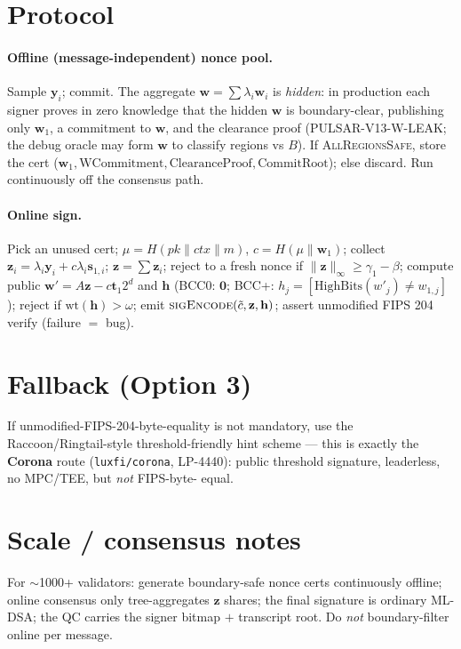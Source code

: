 \documentclass[11pt]{article}
\theoremstyle{remark}\newtheorem{remark}{Remark}
\begin{document}
\section{Protocol}
\paragraph{Offline (message-independent) nonce pool.} Sample $\mathbf
y_i$; commit. The aggregate $\mathbf w = \sum\lambda_i\mathbf w_i$ is
\emph{hidden}: in production each signer proves in zero knowledge that the
hidden $\mathbf w$ is boundary-clear, publishing only $\mathbf w_1$, a
commitment to $\mathbf w$, and the clearance proof (PULSAR-V13-W-LEAK; the
debug oracle may form $\mathbf w$ to classify regions vs $B$). If
\textsc{AllRegionsSafe}, store the cert ($\mathbf w_1,\text{WCommitment},
\text{ClearanceProof},\text{CommitRoot}$); else discard. Run continuously off
the consensus path.
\paragraph{Online sign.} Pick an unused cert; $\mu = H(pk\|ctx\|m)$, $c =
H(\mu\|\mathbf w_1)$; collect $\mathbf z_i = \lambda_i\mathbf y_i +
c\lambda_i\mathbf s_{1,i}$; $\mathbf z = \sum\mathbf z_i$; reject to a
fresh nonce if $\|\mathbf z\|_\infty \ge \gamma_1-\beta$; compute public
$\mathbf w' = A\mathbf z - c\mathbf t_1 2^d$ and $\mathbf h$ (BCC0:
$\mathbf 0$; BCC+: $h_j=[\mathrm{HighBits}(w'_j)\neq w_{1,j}]$); reject if
$\mathrm{wt}(\mathbf h) > \omega$; emit $\textsc{sigEncode}(\tilde
c,\mathbf z,\mathbf h)$; assert unmodified FIPS 204 verify (failure $=$
bug).

\section{Fallback (Option 3)}
If unmodified-FIPS-204-byte-equality is not mandatory, use the
Raccoon/Ringtail-style threshold-friendly hint scheme --- this is exactly
the \textbf{Corona} route (\texttt{luxfi/corona}, LP-4440): public
threshold signature, leaderless, no MPC/TEE, but \emph{not} FIPS-byte-
equal.

\section{Scale / consensus notes}
For $\sim$1000+ validators: generate boundary-safe nonce certs
continuously offline; online consensus only tree-aggregates $\mathbf z$
shares; the final signature is ordinary ML-DSA; the QC carries the signer
bitmap $+$ transcript root. Do \emph{not} boundary-filter online per
message.
\end{document}
